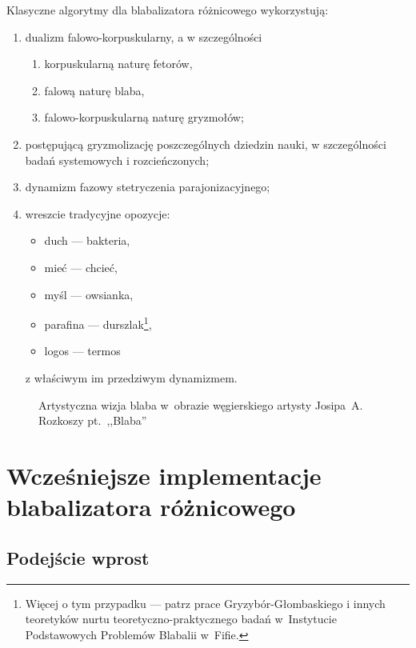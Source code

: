 \documentclass[licencjacka,en]{pracamgr}
\begin{document}
Klasyczne algorytmy dla blabalizatora różnicowego wykorzystują:
\begin{enumerate}
  \item dualizm falowo-korpuskularny, a w szczególności
        \begin{enumerate}
          \item korpuskularną naturę fetorów,
          \item falową naturę blaba,
          \item falowo-korpuskularną naturę gryzmołów;
        \end{enumerate}
  \item postępującą gryzmolizację poszczególnych dziedzin nauki, w
        szczególności badań systemowych i rozcieńczonych;
  \item dynamizm fazowy stetryczenia parajonizacyjnego;
  \item wreszcie tradycyjne opozycje:
        \begin{itemize}
          \item duch --- bakteria,
          \item mieć --- chcieć,
          \item myśl --- owsianka,
          \item parafina --- durszlak\footnote{Więcej o tym przypadku --- patrz
                  prace Gryzybór-Głombaskiego i innych teoretyków nurtu
                  teoretyczno-praktycznego badań w~Instytucie Podstawowych
                  Problemów Blabalii w~Fifie.},
          \item logos --- termos%
        \end{itemize}
        z właściwym im przedziwym dynamizmem.
\end{enumerate}

\begin{figure}[tp]
  \centering
  \caption{Artystyczna wizja blaba w~obrazie węgierskiego artysty
    Josipa~A. Rozkoszy pt.~,,Blaba''}
\end{figure}

\chapter{Wcześniejsze implementacje blabalizatora
  różnicowego}\label{r:losers}

\section{Podejście wprost}
\end{document}
